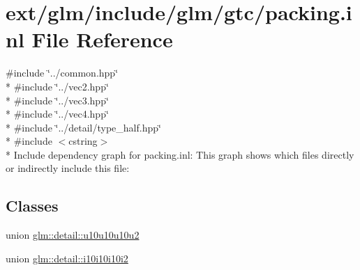\hypertarget{packing_8inl}{\section{ext/glm/include/glm/gtc/packing.inl File Reference}
\label{packing_8inl}
}
{\ttfamily \#include \char`\"{}../common.\-hpp\char`\"{}}\\*
{\ttfamily \#include \char`\"{}../vec2.\-hpp\char`\"{}}\\*
{\ttfamily \#include \char`\"{}../vec3.\-hpp\char`\"{}}\\*
{\ttfamily \#include \char`\"{}../vec4.\-hpp\char`\"{}}\\*
{\ttfamily \#include \char`\"{}../detail/type\-\_\-half.\-hpp\char`\"{}}\\*
{\ttfamily \#include $<$cstring$>$}\\*
Include dependency graph for packing.\-inl\-:
This graph shows which files directly or indirectly include this file\-:
\subsection*{Classes}
\begin{DoxyCompactItemize}
\item 
union \hyperlink{unionglm_1_1detail_1_1u10u10u10u2}{glm\-::detail\-::u10u10u10u2}
\item 
union \hyperlink{unionglm_1_1detail_1_1i10i10i10i2}{glm\-::detail\-::i10i10i10i2}
\end{DoxyCompactItemize}
